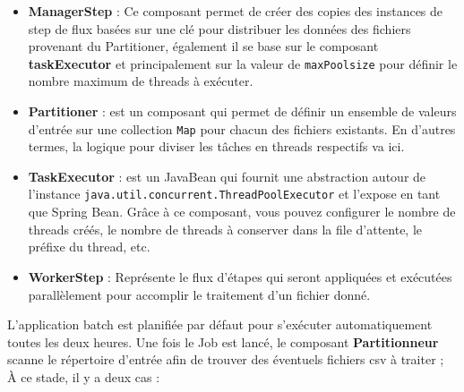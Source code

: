 \begin{itemize}
    \item \textbf{ManagerStep} : Ce composant permet de créer des copies des instances de step de flux basées sur une clé pour distribuer les données des fichiers provenant du Partitioner, également il se base sur le composant \textbf{taskExecutor} et principalement sur la valeur de \lstinline|maxPoolsize| pour définir le nombre maximum de threads à exécuter.
    \item \textbf{Partitioner} : est un composant qui permet de définir un ensemble de valeurs d'entrée sur une collection \lstinline|Map| pour chacun des fichiers existants. En d'autres termes, la logique pour diviser les tâches en threads respectifs va ici.
    \item \textbf{TaskExecutor} : est un JavaBean qui fournit une abstraction autour de l'instance \lstinline|java.util.concurrent.ThreadPoolExecutor| et l'expose en tant que Spring Bean. Grâce à ce composant, vous pouvez configurer le nombre de threads créés, le nombre de threads à conserver dans la file d'attente, le préfixe du thread, etc.
    \item \textbf{WorkerStep} : Représente le flux d'étapes qui seront appliquées et exécutées parallèlement pour accomplir le traitement d'un fichier donné.\\
\end{itemize}
L'application batch est planifiée par défaut pour s'exécuter automatiquement toutes les deux heures. Une fois le Job est lancé, le composant \textbf{Partitionneur} scanne le répertoire d'entrée afin de trouver des éventuels fichiers csv à traiter ;\\
À ce stade, il y a deux cas :

